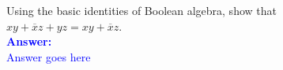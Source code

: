 \item{}
Using the basic identities of Boolean algebra, show that\\[6pt]
$xy+\overline{x}z+yz=xy+\overline{x}z$.\\[12pt]
\ifanswers
\textcolor{blue}{
\textbf{Answer:}\\[12pt]
Answer goes here
}
\newpage
\fi

